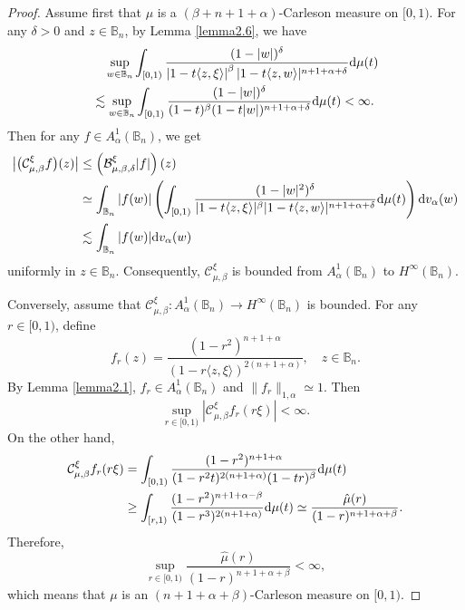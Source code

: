\documentclass[preprint,12pt,times]{elsarticle}
\theoremstyle{definition}
\theoremstyle{remark}
\numberwithin{equation}{section}
\begin{document}
\begin{proof}
Assume first that $\mu$ is a $(\beta+n+1+\alpha)$-Carleson measure on $[0,1)$. For any $\delta>0$ and $z\in\mathbb{B}_n$, by Lemma \ref{lemma2.6}, we have
\begin{align*}
&\quad\sup_{w\in \mathbb{B}_n}\int_{[0,1)}\frac{(1-|w|)^{\delta}}{\left|1-t\langle z,\xi\rangle\right|^{\beta}|1-t\langle z,w\rangle|^{n+1+\alpha+\delta}}{\rm d}\mu(t)\\
&\lesssim \sup_{w\in\mathbb{B}_n}\int_{[0,1)}\frac{(1-|w|)^{\delta}}{(1-t)^{\beta}(1-t|w|)^{n+1+\alpha+\delta}}{\rm d}\mu(t)<\infty.
\end{align*}
Then for any $f\in A_{\alpha}^1(\mathbb{B}_n)$, we get 
\begin{align*}
\big|\big(\mathcal{C}_{\mu,\beta}^{\xi}f\big)(z)\big|&\leq \left(\mathcal{B}_{\mu,\beta,\delta}^{\xi}|f|\right)(z)\\
&\simeq \int_{\mathbb{B}_n}|f(w)|\left(\int_{[0,1)}\frac{(1-|w|^2)^{\delta}}{|1-t\langle z,\xi\rangle|^{\beta}|1-t\langle z,w\rangle|^{n+1+\alpha+\delta}}{\rm d}\mu(t)\right){\rm d}v_{\alpha}(w)\\
&\lesssim \int_{\mathbb{B}_n}|f(w)|{\rm d}v_{\alpha}(w)
\end{align*}
uniformly in $z\in\mathbb{B}_n$. Consequently, $\mathcal C_{\mu,\beta}^{\xi}$  is bounded from $A_{\alpha}^1(\mathbb{B}_n)$ to $H^{\infty}(\mathbb{B}_n)$.

Conversely, assume that $\mathcal{C}_{\mu,\beta}^{\xi}: A_{\alpha}^1(\mathbb{B}_n)\to H^{\infty}(\mathbb{B}_n)$ is bounded. For any $r\in [0,1)$, define
\[
    f_r(z)=\frac{(1-r^2)^{n+1+\alpha}}{(1-r\langle z,\xi\rangle)^{2(n+1+\alpha)}},\quad z\in\mathbb{B}_n.
\]
By Lemma \ref{lemma2.1}, $f_r\in A_{\alpha}^1(\mathbb{B}_n)$ and $\|f_r\|_{1,\alpha}\simeq 1$. Then
\[
    \sup_{r\in [0,1)}\left|\mathcal{C}_{\mu,\beta}^{\xi}f_r(r\xi)\right|<\infty.
\]
On the other hand,
\begin{align*}
\mathcal{C}_{\mu,\beta}^{\xi}f_r(r\xi)&=\int_{[0,1)}\frac{(1-r^2)^{n+1+\alpha}}{(1-r^2t)^{2(n+1+\alpha)}(1-tr)^{\beta}}{\rm d}\mu(t)\\
&\geq \int_{[r,1)}\frac{(1-r^2)^{n+1+\alpha-\beta}}{(1-r^3)^{2(n+1+\alpha)}}{\rm d}\mu(t)\simeq \frac{\hat{\mu}(r)}{(1-r)^{n+1+\alpha+\beta}}.
\end{align*}
Therefore,
\[
    \sup_{r\in [0,1)}\frac{\hat{\mu}(r)}{(1-r)^{n+1+\alpha+\beta}}<\infty,
\]
which means that $\mu$ is an $(n+1+\alpha+\beta)$-Carleson measure on $[0,1)$.
\end{proof}
\end{document}
